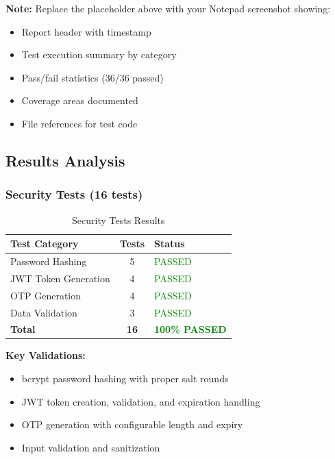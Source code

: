 \documentclass[12pt,a4paper]{article}
\begin{document}
\textbf{Note:} Replace the placeholder above with your Notepad screenshot showing:
\begin{itemize}
    \item Report header with timestamp
    \item Test execution summary by category
    \item Pass/fail statistics (36/36 passed)
    \item Coverage areas documented
    \item File references for test code
\end{itemize}

\subsection{Results Analysis}

\subsubsection{Security Tests (16 tests)}

\begin{table}[H]
\centering
\begin{tabular}{|l|c|l|}
\hline
\textbf{Test Category} & \textbf{Tests} & \textbf{Status} \\
\hline
Password Hashing & 5 & \textcolor{green}{PASSED} \\
JWT Token Generation & 4 & \textcolor{green}{PASSED} \\
OTP Generation & 4 & \textcolor{green}{PASSED} \\
Data Validation & 3 & \textcolor{green}{PASSED} \\
\hline
\textbf{Total} & \textbf{16} & \textcolor{green}{\textbf{100\% PASSED}} \\
\hline
\end{tabular}
\caption{Security Tests Results}
\end{table}

\textbf{Key Validations:}
\begin{itemize}
    \item bcrypt password hashing with proper salt rounds
    \item JWT token creation, validation, and expiration handling
    \item OTP generation with configurable length and expiry
    \item Input validation and sanitization
\end{itemize}
\end{document}
